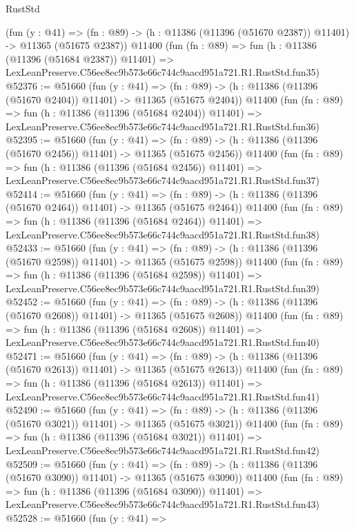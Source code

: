 \begin{lexlean}{RustStd}
\begin{coremodule}
    (fun (y : @41) =>
    (fn : @89) -> (h : @11386 (@11396 (@51670 @2387)) @11401) -> @11365 (@51675 @2387))
    @11400
    (fun (fn : @89) =>
    fun (h : @11386 (@11396 (@51684 @2387)) @11401) =>
    LexLeanPreserve.C56ee8ec9b573e66c744c9aacd951a721.R1.RustStd.fun35)
@52376 := @51660
    (fun (y : @41) =>
    (fn : @89) -> (h : @11386 (@11396 (@51670 @2404)) @11401) -> @11365 (@51675 @2404))
    @11400
    (fun (fn : @89) =>
    fun (h : @11386 (@11396 (@51684 @2404)) @11401) =>
    LexLeanPreserve.C56ee8ec9b573e66c744c9aacd951a721.R1.RustStd.fun36)
@52395 := @51660
    (fun (y : @41) =>
    (fn : @89) -> (h : @11386 (@11396 (@51670 @2456)) @11401) -> @11365 (@51675 @2456))
    @11400
    (fun (fn : @89) =>
    fun (h : @11386 (@11396 (@51684 @2456)) @11401) =>
    LexLeanPreserve.C56ee8ec9b573e66c744c9aacd951a721.R1.RustStd.fun37)
@52414 := @51660
    (fun (y : @41) =>
    (fn : @89) -> (h : @11386 (@11396 (@51670 @2464)) @11401) -> @11365 (@51675 @2464))
    @11400
    (fun (fn : @89) =>
    fun (h : @11386 (@11396 (@51684 @2464)) @11401) =>
    LexLeanPreserve.C56ee8ec9b573e66c744c9aacd951a721.R1.RustStd.fun38)
@52433 := @51660
    (fun (y : @41) =>
    (fn : @89) -> (h : @11386 (@11396 (@51670 @2598)) @11401) -> @11365 (@51675 @2598))
    @11400
    (fun (fn : @89) =>
    fun (h : @11386 (@11396 (@51684 @2598)) @11401) =>
    LexLeanPreserve.C56ee8ec9b573e66c744c9aacd951a721.R1.RustStd.fun39)
@52452 := @51660
    (fun (y : @41) =>
    (fn : @89) -> (h : @11386 (@11396 (@51670 @2608)) @11401) -> @11365 (@51675 @2608))
    @11400
    (fun (fn : @89) =>
    fun (h : @11386 (@11396 (@51684 @2608)) @11401) =>
    LexLeanPreserve.C56ee8ec9b573e66c744c9aacd951a721.R1.RustStd.fun40)
@52471 := @51660
    (fun (y : @41) =>
    (fn : @89) -> (h : @11386 (@11396 (@51670 @2613)) @11401) -> @11365 (@51675 @2613))
    @11400
    (fun (fn : @89) =>
    fun (h : @11386 (@11396 (@51684 @2613)) @11401) =>
    LexLeanPreserve.C56ee8ec9b573e66c744c9aacd951a721.R1.RustStd.fun41)
@52490 := @51660
    (fun (y : @41) =>
    (fn : @89) -> (h : @11386 (@11396 (@51670 @3021)) @11401) -> @11365 (@51675 @3021))
    @11400
    (fun (fn : @89) =>
    fun (h : @11386 (@11396 (@51684 @3021)) @11401) =>
    LexLeanPreserve.C56ee8ec9b573e66c744c9aacd951a721.R1.RustStd.fun42)
@52509 := @51660
    (fun (y : @41) =>
    (fn : @89) -> (h : @11386 (@11396 (@51670 @3090)) @11401) -> @11365 (@51675 @3090))
    @11400
    (fun (fn : @89) =>
    fun (h : @11386 (@11396 (@51684 @3090)) @11401) =>
    LexLeanPreserve.C56ee8ec9b573e66c744c9aacd951a721.R1.RustStd.fun43)
@52528 := @51660
    (fun (y : @41) =>

\end{coremodule}
\end{lexlean}
